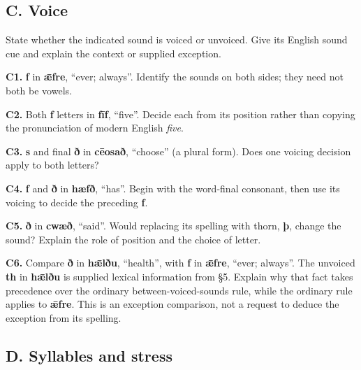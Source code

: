 \subsection*{C. Voice}

State whether the indicated sound is voiced or unvoiced. Give its English sound cue and explain the context or supplied exception.

\textbf{C1.} \textbf{f} in \textbf{ǣfre}, “ever; always”. Identify the sounds on both sides; they need not both be vowels.

\textbf{C2.} Both \textbf{f} letters in \textbf{fīf}, “five”. Decide each from its position rather than copying the pronunciation of modern English \emph{five}.

\textbf{C3.} \textbf{s} and final \textbf{ð} in \textbf{cēosað}, “choose” (a plural form). Does one voicing decision apply to both letters?

\textbf{C4.} \textbf{f} and \textbf{ð} in \textbf{hæfð}, “has”. Begin with the word-final consonant, then use its voicing to decide the preceding \textbf{f}.

\textbf{C5.} \textbf{ð} in \textbf{cwæð}, “said”. Would replacing its spelling with thorn, \textbf{þ}, change the sound? Explain the role of position and the choice of letter.

\textbf{C6.} Compare \textbf{ð} in \textbf{hǣlðu}, “health”, with \textbf{f} in \textbf{ǣfre}, “ever; always”. The unvoiced \textbf{th} in \textbf{hǣlðu} is supplied lexical information from §5. Explain why that fact takes precedence over the ordinary between-voiced-sounds rule, while the ordinary rule applies to \textbf{ǣfre}. This is an exception comparison, not a request to deduce the exception from its spelling.

\subsection*{D. Syllables and stress}

